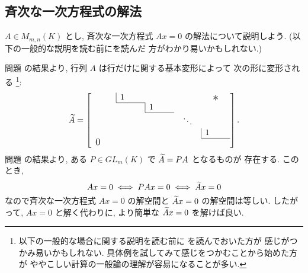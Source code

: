\documentclass[12pt,twoside]{jarticle}
\begin{document}

\subsection{斉次な一次方程式の解法}
\label{sec:sol-hom-lin-eq}

$A\in M_{m,n}(K)$ とし, 斉次な一次方程式 $Ax=0$ の解法について説明しよう. 
(以下の一般的な説明を読む前にを読んだ
方がわかり易いかもしれない.)

問題  の結果より, 行列 $A$ は行だけに関する基本変形によって
次の形に変形される%
\footnote{以下の一般的な場合に関する説明を読む前に
  を読んでおいた方が
  感じがつかみ易いかもしれない.  
  具体例を試してみて感じをつかむことから始めた方が
  ややこしい計算の一般論の理解が容易になることが多い.}:
\begin{equation*}
  \tA = 
  \left[
    \begin{array}{ccccc}
      \multicolumn{1}{c|}{\qquad} & 1 \qquad & & & \bigstaru \\
      \cline{2-2}
      \multicolumn{2}{c|}{} & 1 \qquad & & \\
      \cline{3-3}
      \multicolumn{3}{c}{} & \;\;\ddots\;\; & \\
      \multicolumn{4}{c|}{} & 1 \qquad \\
      \cline{5-5}
      \multicolumn{5}{l}{\bigzerol} \\
    \end{array}
  \right]. 
\end{equation*}
問題  の結果より, ある $P\in GL_m(K)$ で ${\widetilde A}=PA$ となるものが
存在する. このとき, 
\begin{equation*}
  Ax = 0 \iff PAx = 0 \iff {\widetilde A} x = 0
\end{equation*}
なので斉次な一次方程式 $Ax=0$ の解空間と ${\widetilde A} x=0$ の解空間は等しい.
したがって, $Ax=0$ と解く代わりに, より簡単な ${\widetilde A} x=0$ を解けば良い.
\end{document}
